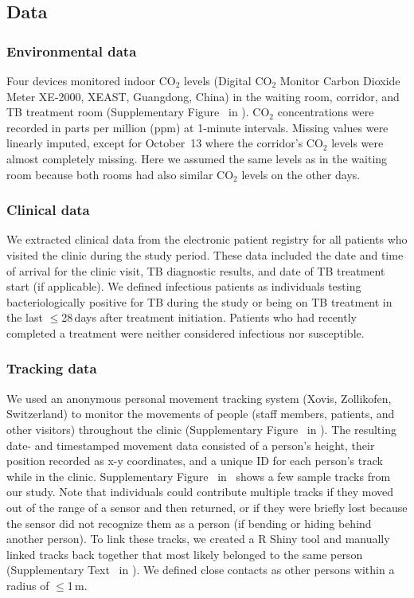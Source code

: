 \documentclass[fleqn,11pt]{wlscirep}
\begin{document}
\subsection{Data}

\subsubsection{Environmental data}

Four devices monitored indoor CO$_2$ levels (Digital CO$_2$ Monitor Carbon Dioxide Meter XE-2000, XEAST, Guangdong, China) in the waiting room, corridor, and TB treatment room (Supplementary Figure~ in \supp). CO$_2$ concentrations were recorded in parts per million (ppm) at 1-minute intervals. Missing values were linearly imputed, except for October~13 where the corridor's CO$_2$ levels were almost completely missing. Here we assumed the same levels as in the waiting room because both rooms had also similar CO$_2$ levels on the other days.    

\subsubsection{Clinical data}

We extracted clinical data from the electronic patient registry for all patients who visited the clinic during the study period. These data included the date and time of arrival for the clinic visit, TB diagnostic results, and date of TB treatment start (if applicable). We defined infectious patients as individuals testing bacteriologically positive for TB during the study or being on TB treatment in the last $\leq$28\,days after treatment initiation. Patients who had recently completed a treatment were neither considered infectious nor susceptible.

\subsubsection{Tracking data}

We used an anonymous personal movement tracking system (Xovis, Zollikofen, Switzerland) to monitor the movements of people (staff members, patients, and other visitors) throughout the clinic (Supplementary Figure~ in \supp). The resulting date- and timestamped movement data consisted of a person’s height, their position recorded as x-y coordinates, and a unique ID for each person's track while in the clinic. Supplementary Figure~ in \supp~shows a few sample tracks from our study. Note that individuals could contribute multiple tracks if they moved out of the range of a sensor and then returned, or if they were briefly lost because the sensor did not recognize them as a person (\eg if bending or hiding behind another person). To link these tracks, we created a R Shiny tool and manually linked tracks back together that most likely belonged to the same person (Supplementary Text~ in \supp). We defined close contacts as other persons within a radius of $\leq$1\,m. 
\end{document}
